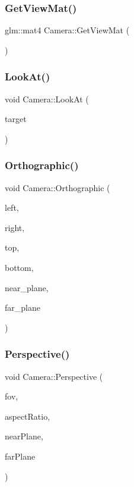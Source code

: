 \subsubsection{\texorpdfstring{GetViewMat()}{GetViewMat()}}
{\footnotesize\ttfamily glm\+::mat4 Camera\+::\+Get\+View\+Mat (\begin{DoxyParamCaption}{ }\end{DoxyParamCaption})}

\mbox{\label{class_camera_a657181de0da2b330865d005a3e08cc9f}} 
\subsubsection{\texorpdfstring{LookAt()}{LookAt()}}
{\footnotesize\ttfamily void Camera\+::\+Look\+At (\begin{DoxyParamCaption}\item[{glm\+::vec3}]{target }\end{DoxyParamCaption})}

\mbox{\label{class_camera_ad434a557e137d9c24369a3737f857736}} 
\subsubsection{\texorpdfstring{Orthographic()}{Orthographic()}}
{\footnotesize\ttfamily void Camera\+::\+Orthographic (\begin{DoxyParamCaption}\item[{G\+Lfloat}]{left,  }\item[{G\+Lfloat}]{right,  }\item[{G\+Lfloat}]{top,  }\item[{G\+Lfloat}]{bottom,  }\item[{G\+Lfloat}]{near\+\_\+plane,  }\item[{G\+Lfloat}]{far\+\_\+plane }\end{DoxyParamCaption})}

\mbox{\label{class_camera_a61d3c3da4bab7c69c7f24c3f37abe1e5}} 
\subsubsection{\texorpdfstring{Perspective()}{Perspective()}}
{\footnotesize\ttfamily void Camera\+::\+Perspective (\begin{DoxyParamCaption}\item[{G\+Lfloat}]{fov,  }\item[{G\+Lfloat}]{aspect\+Ratio,  }\item[{G\+Lfloat}]{near\+Plane,  }\item[{G\+Lfloat}]{far\+Plane }\end{DoxyParamCaption})}

